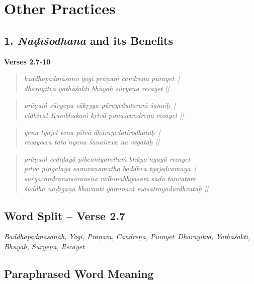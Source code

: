 \section*{Other Practices}

\subsection*{1. \textit{Nāḍīśodhana} and its Benefits}

\noindent \textbf{Verses 2.7-10}

\begin{verse}
\textit{baddhapadmāsano yogī prāṇaṁ candreṇa pūrayet |\\
dhārayitvā yathāśakti bhūyaḥ sūryeṇa recayet ||}
\end{verse}

\begin{verse}
\textit{prāṇaṁ sūryeṇa cākṛṣya pūrayedudaraṁ śanaiḥ |\\
vidhivat Kumbhakaṁ kṛtvā punaścandreṇa recayet ||}
\end{verse}

\begin{verse}
\textit{yena tyajet tena pītvā dhārayedatirodhataḥ |\\
recayecca tato'nyena śanaireva na vegataḥ ||}
\end{verse}

\begin{verse}
\textit{prāṇaṁ cediḍayā pibenniyamitaṁ bhūyo'nyayā recayet\\
pītvā piṅgalayā samīraṇamatho baddhvā tyajedvāmayā |\\ 
sūryācandramasoranena vidhinābhyāsaṁ sadā tanvatāṁ\\
śuddhā nāḍigaṇā bhavanti yamināṁ māsatrayādūrdhvataḥ ||}
\end{verse}

\subsection*{Word Split – Verse 2.7}


\textit{Baddhapadmāsanaḥ, Yogi, Prāṇam, Candreṇa, Pūrayet Dhārayitvā, Yathāśakti, Bhūyaḥ, Sūryeṇa, Recayet}

\subsection*{Paraphrased Word Meaning}


